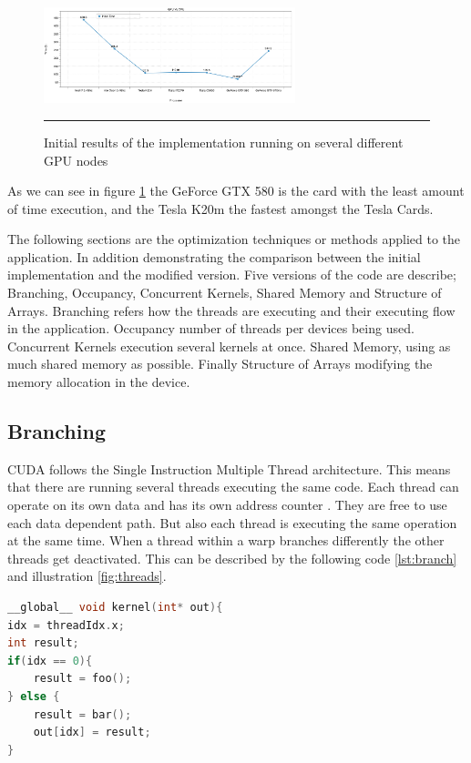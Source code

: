   \begin{figure}[htbp]
	\centering
		\includegraphics[width=0.65\textwidth]{Figures/gpu_initial.png}
		\rule{35em}{0.2pt}
	\caption[Initial GPU results]{Initial results of the implementation running on several different GPU nodes}
	\label{fig:iniresults}
\end{figure}

As we can see in figure \ref{fig:iniresults} the GeForce GTX 580 is the card with the least amount of time execution, and the Tesla K20m the fastest amongst the Tesla Cards. 

The following sections are the optimization techniques or methods applied to the application. In addition demonstrating the comparison between the initial implementation and the modified version. Five versions of the code are describe; Branching, Occupancy, Concurrent Kernels, Shared Memory and Structure of Arrays. Branching refers how the threads are executing and their executing flow in the application. Occupancy number of threads per devices being used. Concurrent Kernels execution several kernels at once. Shared Memory, using as much shared memory as possible. Finally Structure of Arrays modifying the memory allocation in the device.

 \subsection{Branching}
 
 CUDA follows the Single Instruction Multiple Thread architecture. This means that there are running several threads executing the same code. Each thread can operate on its own data and has its own address counter . They are free to use each data dependent path. But also each thread is executing the same operation at the same time. When a thread within a warp branches differently the other threads get deactivated\cite{hoermanngpu}. This can be described by the following code \ref{lst:branch} and illustration \ref{fig:threads}.

\begin{lstlisting}[language=C++, label={lst:branch}, caption={Threads Branching}]
__global__ void kernel(int* out){
idx = threadIdx.x;
int result;
if(idx == 0){
	result = foo();
} else {
	result = bar();
	out[idx] = result;
}
\end{lstlisting}

